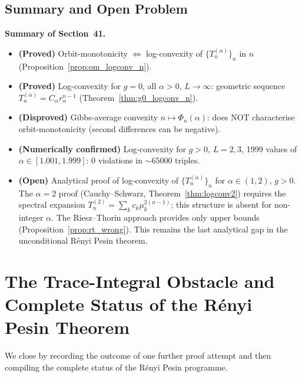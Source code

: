 \documentclass[12pt,a4paper]{article}
\begin{document}
\subsection{Summary and Open Problem}
\label{sec:logconv_n_summary}

\bigskip
\noindent\textbf{Summary of Section~41.}
\begin{itemize}
\item \textbf{(Proved)} Orbit-monotonicity $\Leftrightarrow$ log-convexity of
  $\{T_n^{(\alpha)}\}_n$ in $n$ (Proposition~\ref{prop:om_logconv_n}).
\item \textbf{(Proved)} Log-convexity for $g=0$, all $\alpha>0$, $L\to\infty$:
  geometric sequence $T_n^{(\alpha)}=C_\alpha r_\alpha^{n-1}$
  (Theorem~\ref{thm:g0_logconv_n}).
\item \textbf{(Disproved)} Gibbs-average convexity $n\mapsto\Phi_n(\alpha)$:
  does NOT characterise orbit-monotonicity (second differences can be negative).
\item \textbf{(Numerically confirmed)} Log-convexity for $g>0$, $L=2,3$, 1999 values of
  $\alpha\in[1.001,1.999]$: 0 violations in $\sim 65000$ triples.
\item \textbf{(Open)} Analytical proof of log-convexity of $\{T_n^{(\alpha)}\}_n$
  for $\alpha\in(1,2)$, $g>0$.
  The $\alpha=2$ proof (Cauchy--Schwarz, Theorem~\ref{thm:logconv2}) requires the
  spectral expansion $T_n^{(2)}=\sum_k c_k\mu_k^{2(n-1)}$; this structure is
  absent for non-integer $\alpha$.
  The Riesz--Thorin approach provides only upper bounds (Proposition~\ref{prop:rt_wrong}).
  This remains the last analytical gap in the unconditional Rényi Pesin theorem.
\end{itemize}

\section{The Trace-Integral Obstacle and Complete Status of the Rényi Pesin Theorem}
\label{sec:final_status}

We close by recording the outcome of one further proof attempt and then
compiling the complete status of the Rényi Pesin programme.

\end{document}

